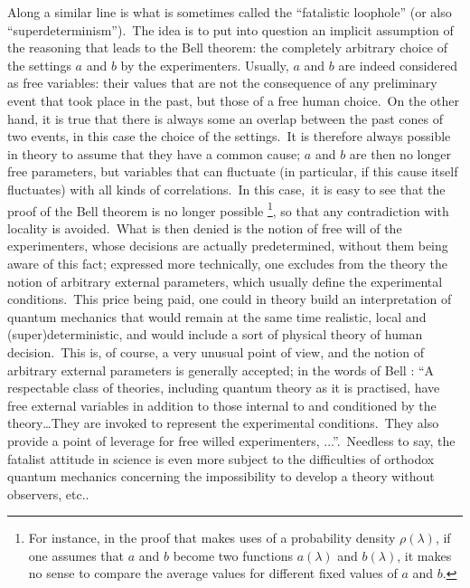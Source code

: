 \documentclass[12pt,onecolumn]{article}%
\begin{document}
Along a similar line is what is sometimes called the ``fatalistic loophole''
(or also ``superdeterminism'').\ The idea is to put into question an implicit
assumption of the reasoning that leads to the Bell theorem: the completely
arbitrary choice of the settings $a$ and $b$ by the experimenters. Usually,
$a$ and $b$ are indeed considered as free variables: their values that are not
the consequence of any preliminary event that took place in the past, but
those of a free human choice.\ On the other hand, it is true that there is
always some an overlap between the past cones of two events, in this case the
choice of the settings.\ It is therefore always possible in theory to assume
that they have a common cause; $a$ and $b$ are then no longer free parameters,
but variables that can fluctuate (in particular, if this cause itself
fluctuates) with all kinds of correlations.\ In this case,\ it is easy to see
that the proof of the Bell theorem is no longer possible \footnote{For
instance, in the proof that makes uses of a probability density $\rho
(\lambda)$, if one assumes that $a$ and $b$ become two functions $a(\lambda)$
and $b(\lambda)$, it makes no sense to compare the average values for
different fixed values of $a$ and $b$.}, so that any contradiction with
locality is avoided.\ What is then denied is the notion of free will of the
experimenters, whose decisions are actually predetermined, without them being
aware of this fact; expressed more technically, one excludes from the theory
the notion of arbitrary external parameters, which usually define the
experimental conditions.\ This price being paid, one could in theory build an
interpretation of quantum mechanics that would remain at the same time
realistic, local and (super)deterministic, and would include a sort of
physical theory of human decision.\ This is, of course, a very unusual point
of view, and the notion of arbitrary external parameters is generally
accepted; in the words of Bell \cite{Bell-once-only}: ``A respectable class of
theories, including quantum theory as it is practised, have free external
variables in addition to those internal to and conditioned by the
theory\ldots They are invoked to represent the experimental conditions.\ They
also provide a point of leverage for free willed experimenters,
...''.\ Needless to say, the fatalist attitude in science is even more subject
to the difficulties of orthodox quantum mechanics concerning the impossibility
to develop a theory without observers, etc..
\end{document}
